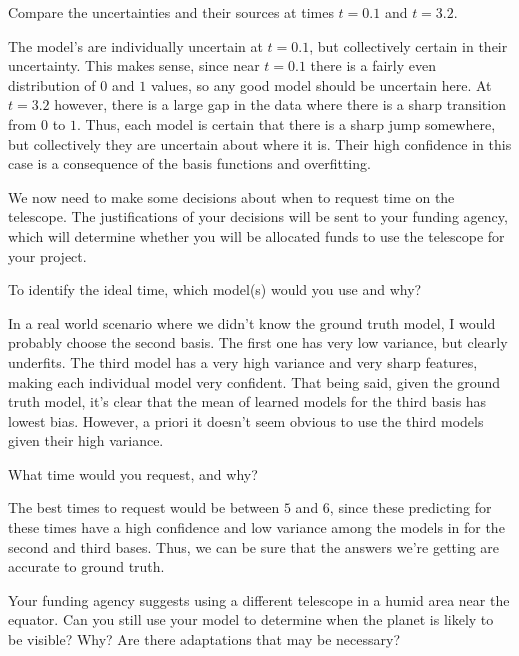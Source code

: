 \documentclass[expanded]{lkx_pset}
\begin{document}
\begin{parts}
	\begin{part}{}
		Compare the uncertainties and their sources at times $t=0.1$ and $t=3.2$.
	\end{part}

	The model's are individually uncertain at $t=0.1$, but collectively certain in their uncertainty. This makes sense, since near $t=0.1$ there is a fairly even distribution of $0$ and $1$ values, so any good model should be uncertain here.
	At $t=3.2$ however, there is a large gap in the data where there is a sharp transition from $0$ to $1$. Thus, each model is certain that there is a sharp jump somewhere, but collectively they are uncertain about where it is. Their high confidence in this case is a consequence of the basis functions and overfitting.

	\begin{part}{5}
		We now need to make some decisions about when to request time on
		the telescope.  The justifications of your decisions will be sent to
		your funding agency, which will determine whether you will be
		allocated funds to use the telescope for your project.
	\end{part}
	\begin{parts}
		\begin{part}{}To identify the ideal time, which model(s) would you use and why?\end{part}

		In a real world scenario where we didn't know the ground truth model, I would probably choose the second basis. The first one has very low variance, but clearly underfits. The third model has a very high variance and very sharp features, making each individual model very confident. That being said, given the ground truth model, it's clear that the mean of learned models for the third basis has lowest bias. However, a priori it doesn't seem obvious to use the third models given their high variance.

		\begin{part}{}
			What time would you request, and why?
		\end{part}

		The best times to request would be between $5$ and $6$, since these predicting for these times have a high confidence and low variance among the models in for the second and third bases. Thus, we can be sure that the answers we're getting are accurate to ground truth.

		\begin{part}{}
			Your funding agency suggests using a different telescope in a
			humid area near the equator. Can you still use your model to
			determine when the planet is likely to be visible?  Why? Are there
			adaptations that may be necessary?
		\end{part}


\end{parts}
\end{parts}
\end{document}
